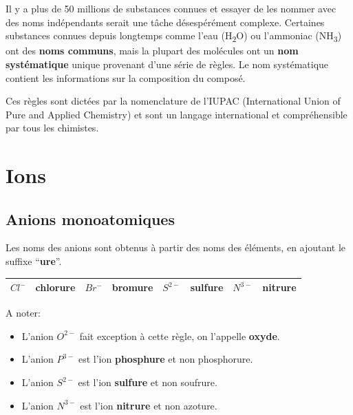 \documentclass[
  11pt,
  a4paper,
  openany]{book}
\providecommand{\tightlist}{%
  \setlength{\itemsep}{0pt}\setlength{\parskip}{0pt}}
\begin{document}
Il y a plus de 50 millions de substances connues et essayer de les nommer avec des noms indépendants serait une tâche désespérément complexe. Certaines substances connues depuis longtemps comme l'eau (H\textsubscript{2}O) ou l'ammoniac (NH\textsubscript{3}) ont des \textbf{noms communs}, mais la plupart des molécules ont un \textbf{nom systématique} unique provenant d'une série de règles. Le nom systématique contient les informations sur la composition du composé.

Ces règles sont dictées par la nomenclature de l'IUPAC (International Union of Pure and Applied Chemistry) et sont un langage international et compréhensible par tous les chimistes.

\hypertarget{ions}{%
\section{Ions}\label{ions}}

\hypertarget{anions-monoatomiques}{%
\subsection{Anions monoatomiques}\label{anions-monoatomiques}}

Les noms des anions sont obtenus à partir des noms des éléments, en ajoutant le suffixe ``\textbf{ure}''.

\begin{longtable}[]{@{}
  >{\centering\arraybackslash}p{}
  >{\raggedright\arraybackslash}p{}
  >{\centering\arraybackslash}p{}
  >{\raggedright\arraybackslash}p{}
  >{\centering\arraybackslash}p{}
  >{\raggedright\arraybackslash}p{}
  >{\centering\arraybackslash}p{}
  >{\centering\arraybackslash}p{}@{}}
\toprule()
\endhead
\(Cl^-\) & chlor\textbf{ure} & \(Br^-\) & brom\textbf{ure} & \(S^{2-}\) & sulf\textbf{ure} & \(N^{3-}\) & nitr\textbf{ure} \\
\bottomrule()
\end{longtable}

A noter:

\begin{itemize}
\tightlist
\item
  L'anion \(O^{2-}\) fait exception à cette règle, on l'appelle \textbf{oxyde}.
\item
  L'anion \(P^{3-}\) est l'ion \textbf{phosphure} et non phosphorure.
\item
  L'anion \(S^{2-}\) est l'ion \textbf{sulfure} et non soufrure.
\item
  L'anion \(N^{3-}\) est l'ion \textbf{nitrure} et non azoture.
\end{itemize}
\end{document}
